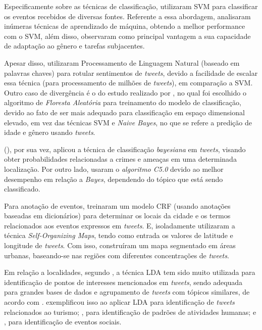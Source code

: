 \documentclass[
	12pt,				%
	oneside,			%
	a4paper,			%
	english,			%
	brazil				%
	]{abntex2ppgsi}
\begin{document}
{{{Especificamente sobre as técnicas de classificação, \cite{Mukherjee2015} utilizaram SVM para classificar os eventos recebidos de diversas fontes. Referente a essa abordagem, \cite{Gal-Tzur2014} analisaram inúmeras técnicas de aprendizado de máquina, obtendo a melhor performance com o SVM, além disso, observaram como principal vantagem a sua capacidade de adaptação ao gênero e tarefas subjacentes. 

Apesar disso, \cite{Guo2016} utilizaram Processamento de Linguagem Natural (baseado em palavras chaves) para rotular sentimentos de \textit{tweets}, devido a facilidade de escalar essa técnica (para processamento de milhões de \textit{tweets}), em comparação a SVM. Outro caso de divergência é o do estudo realizado por \cite{Farseev2015}, no qual foi escolhido o algoritmo de \textit{Floresta Aleatória} para treinamento do modelo de classificação, devido ao fato de ser mais adequado para classificação em espaço dimensional elevado, em vez das técnicas SVM e \textit{Naive Bayes}, no que se refere a predição de idade e gênero usando \textit{tweets}.

\citeauthor{Mata2015} (\citeyear{Mata2015}), por sua vez, aplicou a técnica de classificação \textit{bayesiana} em \textit{tweets}, visando obter probabilidades relacionadas a crimes e ameaças em uma determinada localização. Por outro lado, \cite{Zagal2016} usaram o \textit{algoritmo C5.0} devido ao melhor desempenho em relação a \textit{Bayes}, dependendo do tópico que está sendo classificado. 

Para anotação de eventos, \cite{Anantharam2015} treinaram um modelo CRF (usando anotações baseadas em dicionários) para determinar os locais da cidade e os termos relacionados aos eventos expressos em \textit{tweets}. E, isoladamente \cite{Frias-Martinez2014} utilizaram a técnica \textit{Self-Organizing Maps}, tendo como entrada os valores de latitude e longitude de \textit{tweets}. Com isso, construíram um mapa segmentado em áreas urbanas, baseando-se nas regiões com diferentes concentrações de \textit{tweets}.

Em relação a localidades, segundo \cite{Farseev2015}, a técnica LDA tem sido muito utilizada para identificação de pontos de interesses mencionados em \textit{tweets}, sendo adequada para grandes bases de dados e agrupamento de \textit{tweets} com tópicos similares, de acordo com \cite{Steiger2015Census}. \cite{Abbasi2015} exemplificou isso ao aplicar LDA para identificação de \textit{tweets} relacionados ao turismo; \cite{Hasan2014}, para identificação de padrões de atividades humanas; e \cite{DiLorenzo2013}, para identificação de eventos sociais.

}}}
\end{document}
